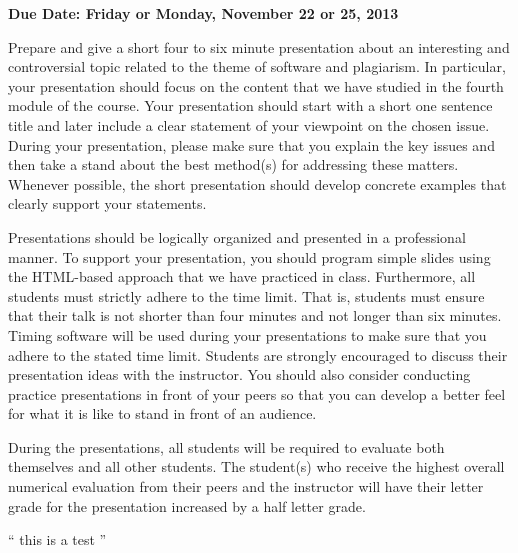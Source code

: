 

\usepackage[compact]{titlesec}



\vspace*{-.2in}
\begin{center}
	{\bf Due Date: Friday or Monday, November 22 or 25, 2013}
\end{center}

Prepare and give a short four to six minute presentation about an interesting and controversial topic related to the
theme of software and plagiarism. In particular, your presentation should focus on the content that we have studied in
the fourth module of the course. Your presentation should start with a short one sentence title and later include a clear
statement of your viewpoint on the chosen issue. During your presentation, please make sure that you explain the key
issues and then take a stand about the best method(s) for addressing these matters. Whenever possible, the short
presentation should develop concrete examples that clearly support your statements.

Presentations should be logically organized and presented in a professional manner. To support your presentation, you
should program simple slides using the HTML-based approach that we have practiced in class. Furthermore, all
students must strictly adhere to the time limit. That is, students must ensure that their talk is not shorter than four
minutes and not longer than six minutes. Timing software will be used during your presentations to make sure that you
adhere to the stated time limit. Students are strongly encouraged to discuss their presentation ideas with the
instructor.  You should also consider conducting practice presentations in front of your peers so that you can develop
a better feel for what it is like to stand in front of an audience.

During the presentations, all students will be required to evaluate both themselves and all other students.  The student(s)
who receive the highest overall numerical evaluation from their peers and the instructor will have their letter grade
for the presentation increased by a half letter grade.

`` this is a test ''


